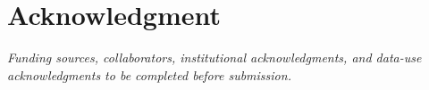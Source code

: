 \documentclass[journal]{IEEEtran}
\begin{document}
\IEEEpeerreviewmaketitle
\acresetall










\appendices

\section*{Acknowledgment}
\textit{Funding sources, collaborators, institutional acknowledgments, and data-use acknowledgments to be completed before submission.}

\ifCLASSOPTIONcaptionsoff
  \newpage
\fi


\end{document}
